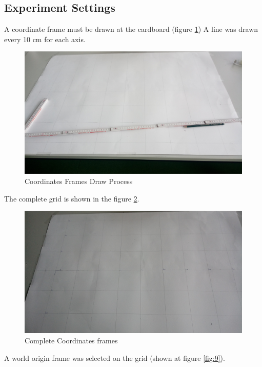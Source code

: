 \documentclass[10pt]{scrartcl}
\begin{document}
\subsection*{Experiment Settings}

A coordinate frame must be drawn at the cardboard (figure \ref{fig:7}) A line was drawn every 10 cm for each axis.

\begin{figure}[h!]
\centering
\includegraphics[trim=200 0 0 0, scale=0.10]{images/settings2}
\caption{Coordinates Frames Draw Process}
\label{fig:7}
\end{figure}

The complete grid is shown in the figure \ref{fig:8}.

\begin{figure}[h!]
\centering
\includegraphics[trim=200 0 0 0, scale=0.10]{images/settings3}
\caption{Complete Coordinates frames}
\label{fig:8}
\end{figure}

A world origin frame was selected on the grid (shown at  figure \ref{fig:9}).
\end{document}
